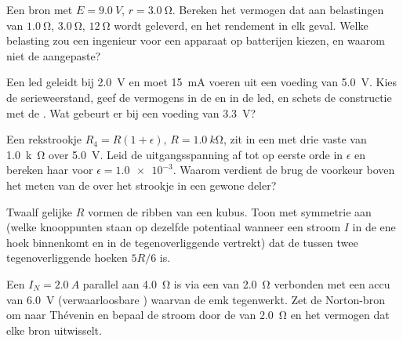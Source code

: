 \begin{exercise}[$\star\star$]\label{exo:b1:dc-circuits:8}
Een bron met $E = \qty{9.0}{V}$, $r = \qty{3.0}{\ohm}$. Bereken het vermogen
dat aan belastingen van $\qty{1.0}{\ohm}$, $\qty{3.0}{\ohm}$, $\qty{12}{\ohm}$
wordt geleverd, en het rendement in elk geval. Welke belasting zou een ingenieur
voor een apparaat op batterijen kiezen, en waarom niet de aangepaste?
\end{exercise}

\begin{exercise}[$\star\star$]\label{exo:b1:dc-circuits:9}
Een led geleidt bij \qty{2.0}{V} en moet \qty{15}{mA} voeren uit een voeding
van \qty{5.0}{V}. Kies de serieweerstand, geef de vermogens in de
 en in de led, en schets de constructie met de . Wat
gebeurt er bij een voeding van \qty{3.3}{V}?
\end{exercise}

\begin{exercise}[$\star\star\star$]\label{exo:b1:dc-circuits:10}
Een rekstrookje $R_4 = R(1 + \epsilon)$, $R = \qty{1.0}{k\ohm}$, zit in een
 met drie vaste  van \qty{1.0}{k\ohm} over
\qty{5.0}{V}. Leid de uitgangsspanning af tot op eerste orde in $\epsilon$ en
bereken haar voor $\epsilon = \num{1.0e-3}$. Waarom verdient de brug de voorkeur
boven het meten van de  over het strookje in een gewone deler?
\end{exercise}

\begin{exercise}[$\star\star\star$]\label{exo:b1:dc-circuits:11}
Twaalf gelijke  $R$ vormen de ribben van een kubus. Toon met
symmetrie aan (welke knooppunten staan op dezelfde potentiaal wanneer een
stroom $I$ in de ene hoek binnenkomt en in de tegenoverliggende vertrekt) dat de
 tussen twee tegenoverliggende hoeken $5R/6$ is.
\end{exercise}

\begin{exercise}[$\star\star\star$]\label{exo:b1:dc-circuits:12}
Een  $I_N = \qty{2.0}{A}$ parallel aan \qty{4.0}{\ohm}
is via een  van \qty{2.0}{\ohm} verbonden met een accu van \qty{6.0}{V}
(verwaarloosbare ) waarvan de emk tegenwerkt. Zet de Norton-bron om
naar Thévenin en bepaal de stroom door de  van \qty{2.0}{\ohm}
en het vermogen dat elke bron uitwisselt.
\end{exercise}

